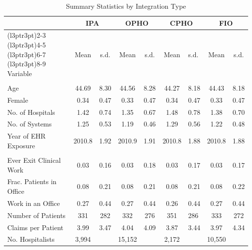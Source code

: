 \begin{table}[h]
\centering
\caption{Summary Statistics by Integration Type}
\centering
\begin{tabular}[t]{lccccclcc}
\toprule
\multicolumn{1}{c}{ } & \multicolumn{2}{c}{IPA} & \multicolumn{2}{c}{OPHO} & \multicolumn{2}{c}{CPHO} & \multicolumn{2}{c}{FIO} \\
\cmidrule(l{3pt}r{3pt}){2-3} \cmidrule(l{3pt}r{3pt}){4-5} \cmidrule(l{3pt}r{3pt}){6-7} \cmidrule(l{3pt}r{3pt}){8-9}
Variable & Mean & s.d. & Mean & s.d. & Mean & s.d. & Mean & s.d.\\
\midrule
\addlinespace[0.3em]
\multicolumn{9}{l}{\textbf{Characteristics}}\\
\hspace{1em}Age & 44.69 & 8.30 & 44.56 & 8.28 & 44.27 & 8.18 & 44.43 & 8.18\\
\hspace{1em}Female & 0.34 & 0.47 & 0.33 & 0.47 & 0.34 & 0.47 & 0.33 & 0.47\\
\hspace{1em}No. of Hospitals & 1.42 & 0.74 & 1.35 & 0.67 & 1.48 & 0.78 & 1.38 & 0.70\\
\hspace{1em}No. of Systems & 1.25 & 0.53 & 1.19 & 0.46 & 1.29 & 0.56 & 1.22 & 0.48\\
\hspace{1em}Year of EHR Exposure & 2010.8 & 1.92 & 2010.9 & 1.91 & 2010.8 & 1.88 & 2010.8 & 1.88\\
\addlinespace[0.3em]
\multicolumn{9}{l}{\textbf{Outcomes}}\\
\hspace{1em}Ever Exit Clinical Work & 0.03 & 0.16 & 0.03 & 0.18 & 0.03 & 0.17 & 0.03 & 0.17\\
\hspace{1em}Frac. Patients in Office & 0.08 & 0.21 & 0.08 & 0.21 & 0.08 & 0.21 & 0.08 & 0.22\\
\hspace{1em}Work in an Office & 0.27 & 0.44 & 0.27 & 0.44 & 0.26 & 0.44 & 0.27 & 0.44\\
\hspace{1em}Number of Patients & 331 & 282 & 332 & 276 & 351 & 286 & 333 & 272\\
\hspace{1em}Claims per Patient & 3.99 & 3.47 & 4.04 & 4.09 & 3.87 & 3.44 & 3.97 & 4.34\\
No. Hospitalists & 3,994 &  & 15,152 &  & 2,172 &  & 10,550 & \\
\bottomrule
\end{tabular}\label{tab:int}
\end{table}